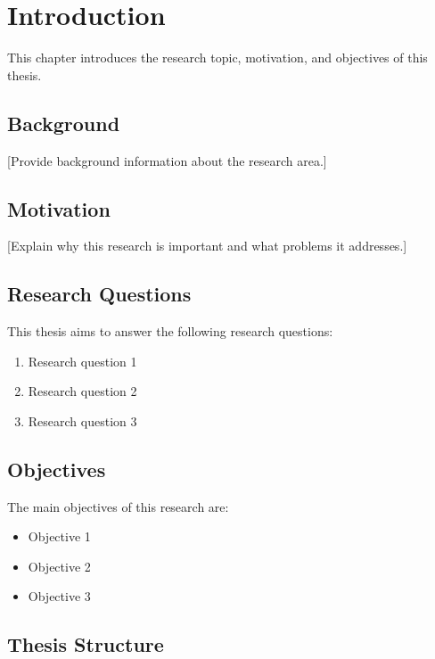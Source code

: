 \chapter{Introduction}
\label{ch:introduction}

This chapter introduces the research topic, motivation, and objectives of this thesis.

\section{Background}
\label{sec:background}

[Provide background information about the research area.]

\section{Motivation}
\label{sec:motivation}

[Explain why this research is important and what problems it addresses.]

\section{Research Questions}
\label{sec:research-questions}

This thesis aims to answer the following research questions:

\begin{enumerate}
    \item Research question 1
    \item Research question 2
    \item Research question 3
\end{enumerate}

\section{Objectives}
\label{sec:objectives}

The main objectives of this research are:

\begin{itemize}
    \item Objective 1
    \item Objective 2
    \item Objective 3
\end{itemize}

\section{Thesis Structure}
\label{sec:thesis-structure}

